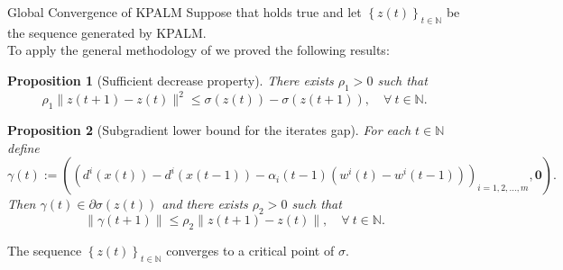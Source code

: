 \documentclass[9pt]{beamer}
\newtheorem{proposition}{Proposition}
\newcommand{\nn}{\mathbb{N}} %
\begin{document}
	\begin{frame}{Global Convergence of KPALM}
		Suppose that  holds true and let $\left\lbrace z(t) \right\rbrace_{t \in \nn}$ be the sequence generated by KPALM.\\
		To apply the general methodology of {\dblue [BST]} we proved the following results:
		\pause
		\begin{proposition}[Sufficient decrease property]
			There exists $\rho_1 > 0$ such that 
			\begin{equation*}
				\rho_1 \|z(t+1) - z(t)\|^2 \leq \sigma(z(t)) - \sigma(z(t+1)), \quad \forall \: t \in \mathbb{N} .
			\end{equation*}
		\end{proposition}
		\pause
		\begin{proposition}[Subgradient lower bound for the iterates gap]
			For each $t \in \nn$ define 
			\begin{equation*}
				\gamma(t) := \left( \left( d^i(x(t)) - d^i(x(t-1)) - \alpha_i(t-1)(w^i(t) - w^i(t-1)) \right)_{i=1,2, \ldots, m}, \mathbf{0} \right).
			\end{equation*}
			Then $\gamma(t) \in \partial \sigma(z(t))$ and there exists $\rho_2 > 0$ such that 
			\begin{equation*}
				\| \gamma(t+1)\| \leq \rho_2 \|z(t+1) - z(t)\|, \quad \forall \: t \in \mathbb{N} .
			\end{equation*}
		\end{proposition}
		\pause
		\begin{theorem}
			The sequence $\left\lbrace z(t) \right\rbrace_{t \in \nn}$ converges to a critical point of $\sigma$.
		\end{theorem}
	\end{frame}	
	
\end{document}
